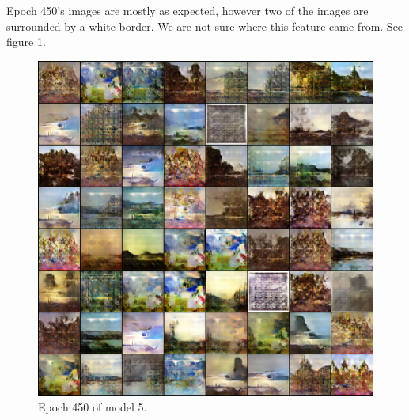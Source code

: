 \documentclass[11pt,letterpaper]{article}
\begin{document}
				Epoch 450's images are mostly as expected, however two of the images are surrounded by a white border.
				We are not sure where this feature came from.
				See figure \ref{fig:wa128:epoch450generator}.
				\begin{figure}
					\centering
					\includegraphics[width=1.0\linewidth]{results/model5/epoch450_generator}
					\caption{Epoch 450 of model 5.}
					\label{fig:wa128:epoch450generator}
				\end{figure}
\end{document}
